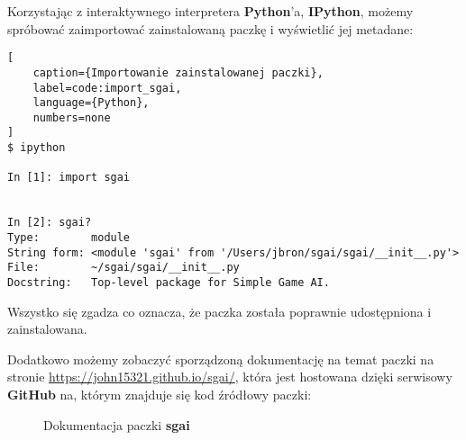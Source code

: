 \clearpage

Korzystając z interaktywnego interpretera \textbf{Python}'a, \textbf{IPython}, możemy spróbować zaimportować zainstalowaną paczkę i wyświetlić jej metadane:

\begin{onepage}
    \begin{lstlisting}[
    caption={Importowanie zainstalowanej paczki},
    label=code:import_sgai,
    language={Python},
    numbers=none
]
$ ipython

In [1]: import sgai


In [2]: sgai?
Type:        module
String form: <module 'sgai' from '/Users/jbron/sgai/sgai/__init__.py'>
File:        ~/sgai/sgai/__init__.py
Docstring:   Top-level package for Simple Game AI.

\end{lstlisting}
\end{onepage}

Wszystko się zgadza co oznacza, że paczka została poprawnie udostępniona i zainstalowana.

Dodatkowo możemy zobaczyć sporządzoną dokumentację na temat paczki na stronie \url{https://john15321.github.io/sgai/}, która jest hostowana dzięki serwisowy \textbf{GitHub} na, którym znajduje się kod źródłowy paczki:


\begin{figure}[h]
    \centering
    \caption{Dokumentacja paczki \textbf{sgai}}
    \label{img:githubdocs}
\end{figure}



